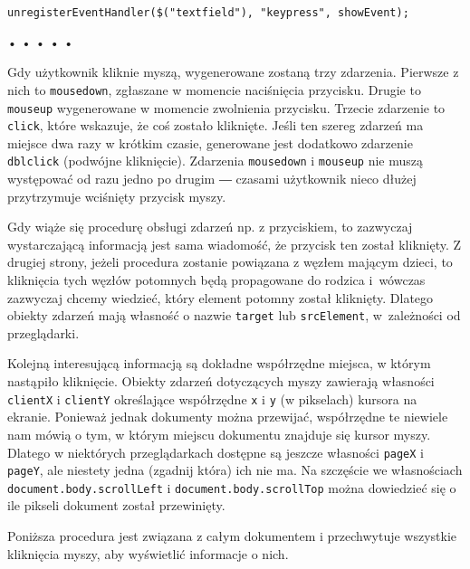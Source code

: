   
\begin{verbatim} 
unregisterEventHandler($("textfield"), "keypress", showEvent);
 \end{verbatim}


\begin{center}
• • • • •
\end{center}

  
Gdy użytkownik kliknie myszą, wygenerowane zostaną trzy zdarzenia. Pierwsze z nich to \texttt{mousedown}, zgłaszane w momencie naciśnięcia przycisku. Drugie to \texttt{mouseup} wygenerowane w momencie zwolnienia przycisku. Trzecie zdarzenie to \texttt{click}, które wskazuje, że coś zostało kliknięte. Jeśli ten szereg zdarzeń ma miejsce dwa razy w krótkim czasie, generowane jest dodatkowo zdarzenie \texttt{dblclick} (podwójne kliknięcie). Zdarzenia \texttt{mousedown} i \texttt{mouseup} nie muszą występować od razu jedno po drugim ― czasami użytkownik nieco dłużej przytrzymuje wciśnięty przycisk myszy.

  
Gdy wiąże się procedurę obsługi zdarzeń np. z przyciskiem, to zazwyczaj wystarczającą informacją jest sama wiadomość, że przycisk ten został kliknięty. Z drugiej strony, jeżeli procedura zostanie powiązana z węzłem mającym dzieci, to kliknięcia tych węzłów potomnych będą propagowane do rodzica i~wówczas zazwyczaj chcemy wiedzieć, który element potomny został kliknięty. Dlatego obiekty zdarzeń mają własność o nazwie \texttt{target} lub \texttt{srcElement}, w~zależności od przeglądarki.

  
Kolejną interesującą informacją są dokładne współrzędne miejsca, w którym nastąpiło kliknięcie. Obiekty zdarzeń dotyczących myszy zawierają własności \texttt{clientX} i \texttt{clientY} określające współrzędne \texttt{x} i \texttt{y} (w pikselach) kursora na ekranie. Ponieważ jednak dokumenty można przewijać, współrzędne te niewiele nam mówią o tym, w którym miejscu dokumentu znajduje się kursor myszy. Dlatego w niektórych przeglądarkach dostępne są jeszcze własności \texttt{pageX} i \texttt{pageY}, ale niestety jedna (zgadnij która) ich nie ma. Na szczęście we własnościach \texttt{document.body.scrollLeft} i \texttt{document.body.scrollTop} można dowiedzieć się o ile pikseli dokument został przewinięty.

  
Poniższa procedura jest związana z całym dokumentem i przechwytuje wszystkie kliknięcia myszy, aby wyświetlić informacje o nich.

